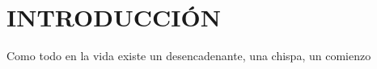 \documentclass[a4paper, 12pt, spanish, twoside]{article}
\newcommand\blankpage{%
    \null
    \thispagestyle{empty}%
    \newpage}
\begin{document}




\newpage

\renewcommand{\listfigurename}{ÍNDICE DE FIGURAS} %
\listoffigures %

\clearpage





\newpage

\listofcodes %

\clearpage
\afterpage{\blankpage} %




\newpage
{}




\newpage
\section{INTRODUCCIÓN} \label{sec:introduccion}

Como todo en la vida existe un desencadenante, una chispa, un comienzo
\end{document}
